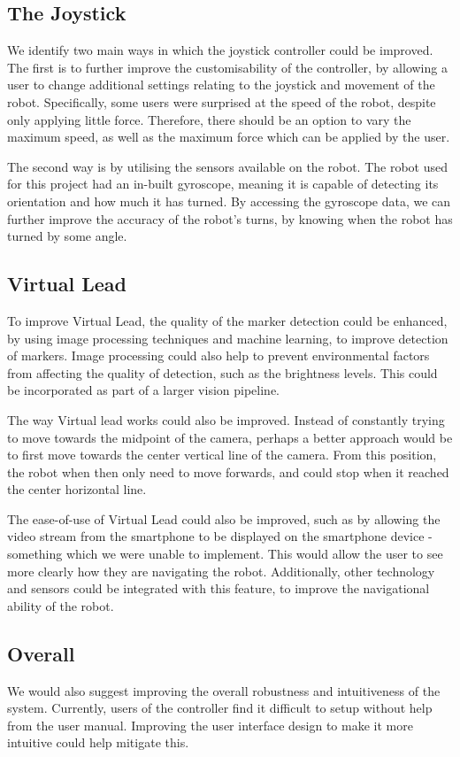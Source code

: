 \documentclass{l4proj}
\begin{document}
\subsection{The Joystick}
We identify two main ways in which the joystick controller could be improved. The first is to further improve the customisability of the controller, by allowing a user to change additional settings relating to the joystick and movement of the robot. Specifically, some users were surprised at the speed of the robot, despite only applying little force. Therefore, there should be an option to vary the maximum speed, as well as the maximum force which can be applied by the user.

The second way is by utilising the sensors available on the robot. The robot used for this project had an in-built gyroscope, meaning it is capable of detecting its orientation and how much it has turned. By accessing the gyroscope data, we can further improve the accuracy of the robot's turns, by knowing when the robot has turned by some angle.

\subsection{Virtual Lead}
To improve Virtual Lead, the quality of the marker detection could be enhanced, by using image processing techniques and machine learning, to improve detection of markers. Image processing could also help to prevent environmental factors from affecting the quality of detection, such as the brightness levels. This could be incorporated as part of a larger vision pipeline.

The way Virtual lead works could also be improved. Instead of constantly trying to move towards the midpoint of the camera, perhaps a better approach would be to first move towards the center vertical line of the camera. From this position, the robot when then only need to move forwards, and could stop when it reached the center horizontal line.

The ease-of-use of Virtual Lead could also be improved, such as by allowing the video stream from the smartphone to be displayed on the smartphone device - something which we were unable to implement. This would allow the user to see more clearly how they are navigating the robot. Additionally, other technology and sensors could be integrated with this feature, to improve the navigational ability of the robot.

\subsection{Overall}
We would also suggest improving the overall robustness and intuitiveness of the system. Currently, users of the controller find it difficult to setup without help from the user manual. Improving the user interface design to make it more intuitive could help mitigate this.
\end{document}
